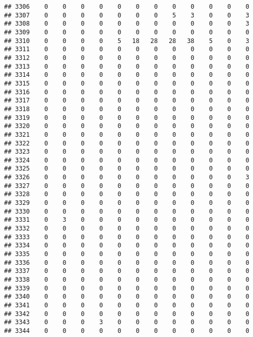 \documentclass[]{article}
\begin{document}
\begin{verbatim}
## 3306    0    0    0    0    0    0    0    0    0    0    0    0
## 3307    0    0    0    0    0    0    0    5    3    0    0    3
## 3308    0    0    0    0    0    0    0    0    0    0    0    3
## 3309    0    0    0    0    0    0    0    0    0    0    0    0
## 3310    0    0    0    0    5   18   28   28   38    5    0    3
## 3311    0    0    0    0    0    0    0    0    0    0    0    0
## 3312    0    0    0    0    0    0    0    0    0    0    0    0
## 3313    0    0    0    0    0    0    0    0    0    0    0    0
## 3314    0    0    0    0    0    0    0    0    0    0    0    0
## 3315    0    0    0    0    0    0    0    0    0    0    0    0
## 3316    0    0    0    0    0    0    0    0    0    0    0    0
## 3317    0    0    0    0    0    0    0    0    0    0    0    0
## 3318    0    0    0    0    0    0    0    0    0    0    0    0
## 3319    0    0    0    0    0    0    0    0    0    0    0    0
## 3320    0    0    0    0    0    0    0    0    0    0    0    0
## 3321    0    0    0    0    0    0    0    0    0    0    0    0
## 3322    0    0    0    0    0    0    0    0    0    0    0    0
## 3323    0    0    0    0    0    0    0    0    0    0    0    0
## 3324    0    0    0    0    0    0    0    0    0    0    0    0
## 3325    0    0    0    0    0    0    0    0    0    0    0    0
## 3326    0    0    0    0    0    0    0    0    0    0    0    3
## 3327    0    0    0    0    0    0    0    0    0    0    0    0
## 3328    0    0    0    0    0    0    0    0    0    0    0    0
## 3329    0    0    0    0    0    0    0    0    0    0    0    0
## 3330    0    0    0    0    0    0    0    0    0    0    0    0
## 3331    0    3    0    0    0    0    0    0    0    0    0    0
## 3332    0    0    0    0    0    0    0    0    0    0    0    0
## 3333    0    0    0    0    0    0    0    0    0    0    0    0
## 3334    0    0    0    0    0    0    0    0    0    0    0    0
## 3335    0    0    0    0    0    0    0    0    0    0    0    0
## 3336    0    0    0    0    0    0    0    0    0    0    0    0
## 3337    0    0    0    0    0    0    0    0    0    0    0    0
## 3338    0    0    0    0    0    0    0    0    0    0    0    0
## 3339    0    0    0    0    0    0    0    0    0    0    0    0
## 3340    0    0    0    0    0    0    0    0    0    0    0    0
## 3341    0    0    0    0    0    0    0    0    0    0    0    0
## 3342    0    0    0    0    0    0    0    0    0    0    0    0
## 3343    0    0    0    3    0    0    0    0    0    0    0    0
## 3344    0    0    0    0    0    0    0    0    0    0    0    0

\end{verbatim}
\end{document}
